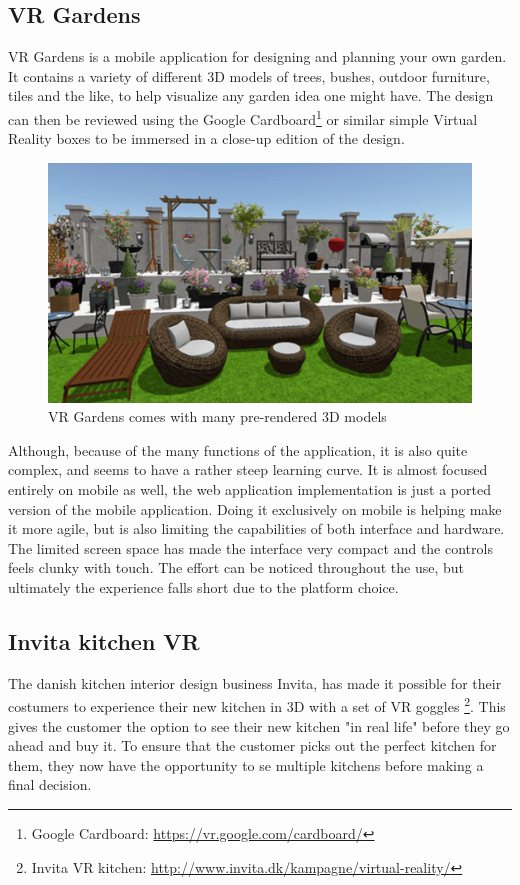 		\subsection{VR Gardens}\label{sec:vrGardens}
			VR Gardens is a mobile application for designing and planning your own garden. It contains a variety of different 3D models of trees, bushes, outdoor furniture, tiles and the like, to help visualize any garden idea one might have. The design can then be reviewed using the Google Cardboard\footnote{Google Cardboard: \url{https://vr.google.com/cardboard/}} or similar simple Virtual Reality boxes to be immersed in a close-up edition of the design.
			\begin{figure}[H]
				\centering
				\includegraphics[width=0.6\linewidth]{figure/Analysis/vrgardens}
				\caption{VR Gardens comes with many pre-rendered 3D models}
				\label{fig:vrgardens}
			\end{figure}
			Although, because of the many functions of the application, it is also quite complex, and seems to have a rather steep learning curve. It is almost focused entirely on mobile as well, the web application implementation is just a ported version of the mobile application. Doing it exclusively on mobile is helping make it more agile, but is also limiting the capabilities of both interface and hardware. The limited screen space has made the interface very compact and the controls feels clunky with touch. The effort can be noticed throughout the use, but ultimately the experience falls short due to the 	platform choice.
			
		\subsection{Invita kitchen VR}\label{sec:invita}
			The danish kitchen interior design business Invita, has made it possible for their costumers to experience their new kitchen in 3D with a set of VR goggles \footnote{Invita VR kitchen: \url{http://www.invita.dk/kampagne/virtual-reality/}}. This gives the customer the option to see their new kitchen "in real life" before they go ahead and buy it. To ensure that the customer picks out the perfect kitchen for them, they now have the opportunity to se multiple kitchens before making a final decision.\\

